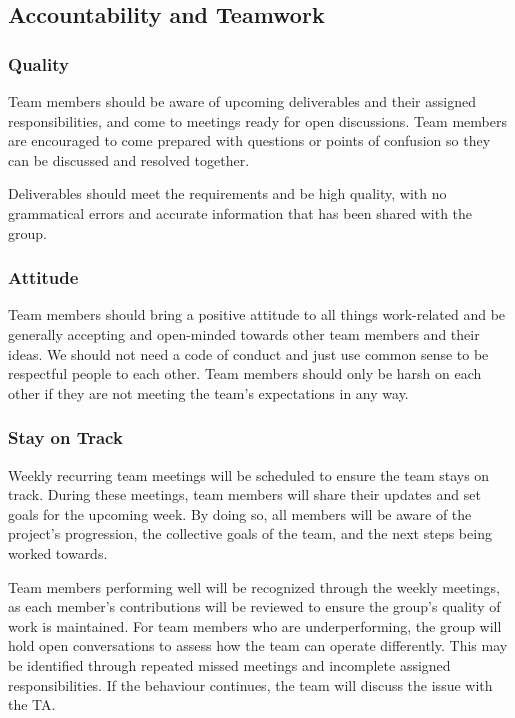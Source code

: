 \subsection*{Accountability and Teamwork}

\subsubsection*{Quality}

Team members should be aware of upcoming deliverables and their assigned responsibilities, and come to meetings ready for open discussions. Team members are encouraged to come prepared with questions or points of confusion so they can be discussed and resolved together.    

Deliverables should meet the requirements and be high quality, with no grammatical errors and accurate information that has been shared with the group.  

\subsubsection*{Attitude}

Team members should bring a positive attitude to all things work-related and be generally accepting and open-minded towards other team members and their ideas. We should not need a code of conduct and just use common sense to be respectful people to each other. Team members should only be harsh on each other if they are not meeting the team’s expectations in any way.

\subsubsection*{Stay on Track}

Weekly recurring team meetings will be scheduled to ensure the team stays on track. During these meetings, team members will share their updates and set goals for the upcoming week. By doing so, all members will be aware of the project's progression, the collective goals of the team, and the next steps being worked towards. 
 
Team members performing well will be recognized through the weekly meetings, as each member's contributions will be reviewed to ensure the group's quality of work is maintained. For team members who are underperforming, the group will hold open conversations to assess how the team can operate differently. This may be identified through repeated missed meetings and incomplete assigned responsibilities. If the behaviour continues, the team will discuss the issue with the TA.

